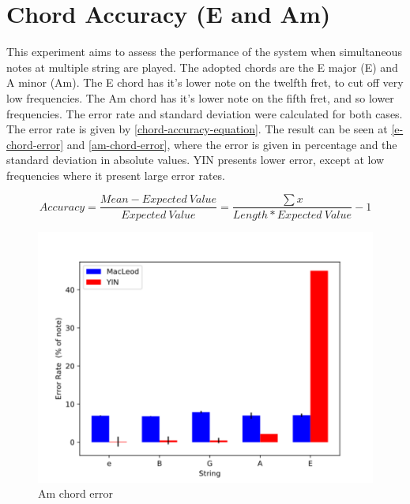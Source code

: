 \section{Chord Accuracy (E and Am)}
This experiment aims to assess the performance of the system when simultaneous notes at multiple string are played.
The adopted chords are the E major (E) and A minor (Am). The E chord has it's lower note on
the twelfth fret, to cut off very low frequencies. The Am chord has it's lower note
on the fifth fret, and so lower frequencies.
The error rate and standard deviation were calculated for both cases. The error rate is given by
\autoref{chord-accuracy-equation}. The result can be seen at \autoref{e-chord-error} and \autoref{am-chord-error}, where the
error is given in percentage and the standard deviation in absolute values.
YIN presents lower error, except at low frequencies where it present large error rates.

\begin{equation}
  \label{chord-accuracy-equation}
  Accuracy = \frac{Mean - Expected\ Value}{Expected\ Value} = \frac{\sum x}{Length * Expected\ Value} -1
\end{equation}

\begin{figure}[!htpb]
  \centering
  \caption{Am chord error}
  \label{am-chord-error}
  \includegraphics[scale=0.85]{images/measurements/am-chord-error}
\end{figure}

